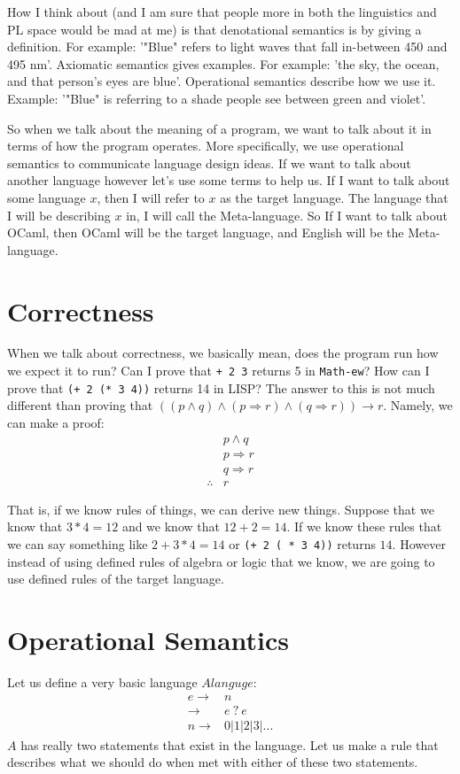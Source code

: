 \documentclass[main.tex]{subfiles}
\begin{document}
How I think about (and I am sure that people more in both the linguistics and PL space would be mad at me) is that denotational semantics is by giving a definition. For example: '"Blue" refers to light waves that fall in-between 450 and 495 nm'. Axiomatic semantics gives examples. For example: 'the sky, the ocean, and that person's eyes are blue'. Operational semantics describe how we use it. Example: '"Blue" is referring to a shade people see between green and violet'. 

So when we talk about the meaning of a program, we want to talk about it in terms of how the program operates. More specifically, we use operational semantics to communicate language design ideas. If we want to talk about another language however let's use some terms to help us. If I want to talk about some language $x$, then I will refer to $x$ as the target language. The language that I will be describing $x$ in, I will call the Meta-language. So If I want to talk about OCaml, then OCaml will be the target language, and English will be the Meta-language. 

\section{Correctness}
When we talk about correctness, we basically mean, does the program run how we expect it to run? Can I prove that \texttt{+ 2 3} returns 5 in \texttt{Math-ew}? How can I prove that \texttt{(+ 2 (* 3 4))} returns 14 in LISP? The answer to this is not much different than proving that $((p \land q) \land (p \Rightarrow r) \land (q \Rightarrow r)) \rightarrow r$. 
Namely, we can make a proof:
$$\begin{array}{rl}
& p \land q\\
& p \Rightarrow r\\
& q \Rightarrow r\\\hline
\therefore & r
\end{array}$$

That is, if we know rules of things, we can derive new things. Suppose that we know that $3 * 4 = 12$ and we know that $12 + 2 = 14$. If we know these rules that we can say something like $2 + 3 * 4 = 14$ or \texttt{(+ 2 ( * 3 4))} returns $14$.  
However instead of using defined rules of algebra or logic that we know, we are going to use defined rules of the target language. 

\section{Operational Semantics}
Let us define a very basic language $Alanguge$:
$$\begin{array}{rl}
e \rightarrow & n\\
\rightarrow & e\ ?\ e\\
n \rightarrow & 0|1|2|3|...
\end{array}$$
$A$ has really two statements that exist in the language. Let us make a rule that describes what we should do when met with either of these two statements. 
\end{document}
